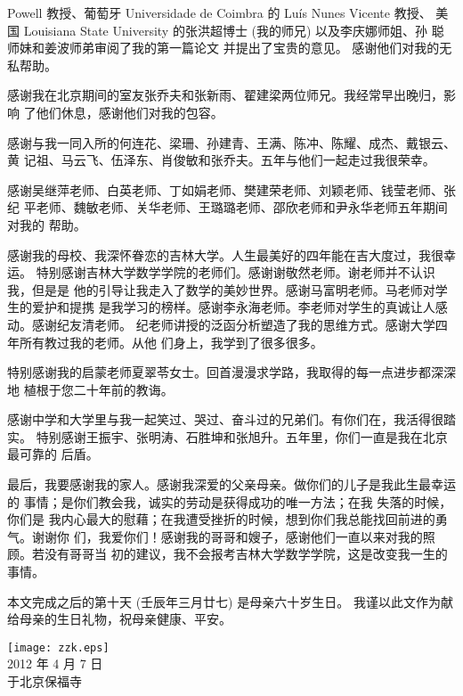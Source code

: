 \begin{thanks}
Powell 教授、葡萄牙 Universidade de Coimbra 的 Lu\'{i}s Nunes Vicente 教授、
美国 Louisiana State University 的张洪超博士 (我的师兄) 以及李庆娜师姐、孙
聪师妹和姜波师弟审阅了我的第一篇论文 \cite{SobolevDFO} 并提出了宝贵的意见。
感谢他们对我的无私帮助。

感谢我在北京期间的室友张乔夫和张新雨、翟建梁两位师兄。我经常早出晚归，影响
了他们休息，感谢他们对我的包容。

感谢与我一同入所的何连花、梁珊、孙建青、王满、陈冲、陈耀、成杰、戴银云、黄
记祖、马云飞、伍泽东、肖俊敏和张乔夫。五年与他们一起走过我很荣幸。


感谢吴继萍老师、白英老师、丁如娟老师、樊建荣老师、刘颖老师、钱莹老师、张纪
平老师、魏敏老师、关华老师、王璐璐老师、邵欣老师和尹永华老师五年期间对我的
帮助。

感谢我的母校、我深怀眷恋的吉林大学。人生最美好的四年能在吉大度过，我很幸运。
特别感谢吉林大学数学学院的老师们。感谢谢敬然老师。谢老师并不认识我，但是是
他的引导让我走入了数学的美妙世界。感谢马富明老师。马老师对学生的爱护和提携
是我学习的榜样。感谢李永海老师。李老师对学生的真诚让人感动。感谢纪友清老师。
纪老师讲授的泛函分析塑造了我的思维方式。感谢大学四年所有教过我的老师。从他
们身上，我学到了很多很多。

特别感谢我的启蒙老师夏翠苓女士。回首漫漫求学路，我取得的每一点进步都深深地
植根于您二十年前的教诲。

感谢中学和大学里与我一起笑过、哭过、奋斗过的兄弟们。有你们在，我活得很踏实。
特别感谢王振宇、张明涛、石胜坤和张旭升。五年里，你们一直是我在北京最可靠的
后盾。

最后，我要感谢我的家人。感谢我深爱的父亲母亲。做你们的儿子是我此生最幸运的
事情；是你们教会我，诚实的劳动是获得成功的唯一方法；在我 失落的时候，你们是
我内心最大的慰藉；在我遭受挫折的时候，想到你们我总能找回前进的勇气。谢谢你
们，我爱你们！感谢我的哥哥和嫂子，感谢他们一直以来对我的照顾。若没有哥哥当
初的建议，我不会报考吉林大学数学学院，这是改变我一生的事情。

本文完成之后的第十天 (壬辰年三月廿七) 是母亲六十岁生日。
我谨以此文作为献给母亲的生日礼物，祝母亲健康、平安。

\begin{flushright}
    {\texttt{[image: zzk.eps]}}\\
    2012 年 4 月 7 日\\
    于北京保福寺
\end{flushright}
\end{thanks}
